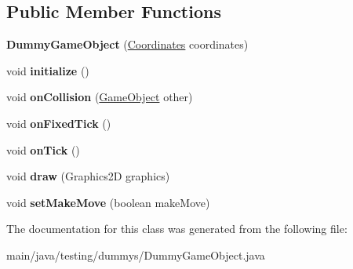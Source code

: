 \subsection*{Public Member Functions}
\begin{DoxyCompactItemize}
\item 
\mbox{\label{classtesting_1_1dummys_1_1_dummy_game_object_ae93ad3d88588f70bd04a3ce296512286}} 
{\bfseries Dummy\+Game\+Object} (\mbox{\hyperlink{classde_1_1me_1_1edgelord_1_1sjgl_1_1location_1_1_coordinates}{Coordinates}} coordinates)
\item 
\mbox{\label{classtesting_1_1dummys_1_1_dummy_game_object_a4a443a8a7b8d1c71769a0823605b3c44}} 
void {\bfseries initialize} ()
\item 
\mbox{\label{classtesting_1_1dummys_1_1_dummy_game_object_a9cd2d609f0b413a7911087d85e9f96b2}} 
void {\bfseries on\+Collision} (\mbox{\hyperlink{classde_1_1me_1_1edgelord_1_1sjgl_1_1gameobject_1_1_game_object}{Game\+Object}} other)
\item 
\mbox{\label{classtesting_1_1dummys_1_1_dummy_game_object_afdebb3c09eeda7bed8b00f9666a562a6}} 
void {\bfseries on\+Fixed\+Tick} ()
\item 
\mbox{\label{classtesting_1_1dummys_1_1_dummy_game_object_a24650f442764e3193469d588db5003a1}} 
void {\bfseries on\+Tick} ()
\item 
\mbox{\label{classtesting_1_1dummys_1_1_dummy_game_object_ad9f851ecdf7c7a0f952efe198274f347}} 
void {\bfseries draw} (Graphics2D graphics)
\item 
\mbox{\label{classtesting_1_1dummys_1_1_dummy_game_object_a083f9242f2204cb19ea3efb61810f1f7}} 
void {\bfseries set\+Make\+Move} (boolean make\+Move)
\end{DoxyCompactItemize}


The documentation for this class was generated from the following file\+:\begin{DoxyCompactItemize}
\item 
main/java/testing/dummys/Dummy\+Game\+Object.\+java\end{DoxyCompactItemize}
